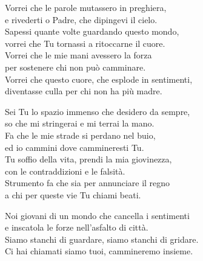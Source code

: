 
\strofa Vorrei che le parole mutassero in preghiera,\\
e rivederti o Padre, che dipingevi il cielo.\\
Sapessi quante volte guardando questo mondo,\\
vorrei che Tu tornassi a ritoccarne il cuore.\\
Vorrei che le mie mani avessero la forza\\
per sostenere chi non può camminare.\\
Vorrei che questo cuore, che esplode in sentimenti,\\
diventasse culla per chi non ha più madre.

\spazio


\spazio

\strofa Sei Tu lo spazio immenso che desidero da sempre,\\
so che mi stringerai e mi terrai la mano.\\
Fa che le mie strade si perdano nel buio,\\
ed io cammini dove cammineresti Tu.\\
Tu soffio della vita, prendi la mia giovinezza,\\
con le contraddizioni e le falsità.\\
Strumento fa che sia per annunciare il regno\\
a chi per queste vie Tu chiami beati.

\spazio


\spazio

\strofa Noi giovani di un mondo che cancella i sentimenti\\
e inscatola le forze nell'asfalto di città.\\
Siamo stanchi di guardare, siamo stanchi di gridare.\\
Ci hai chiamati siamo tuoi, cammineremo insieme.

\spazio


\spazio

